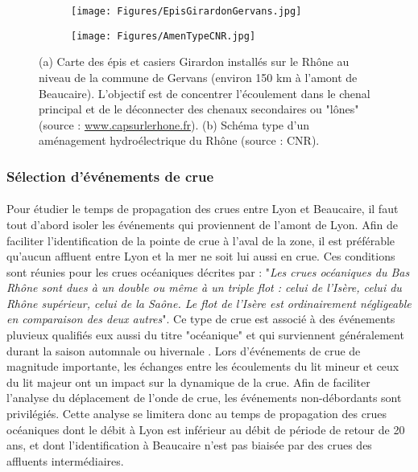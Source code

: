 \documentclass[11pt]{article}
\begin{document}
	\begin{figure}[h!]
		\centering
		\begin{subfigure}{0.7\linewidth}
		\texttt{[image: Figures/EpisGirardonGervans.jpg]}
		\caption{}
		\label{subfig:Girardon}
		\end{subfigure}	
		\begin{subfigure}{0.5\linewidth}
		\centering
		\texttt{[image: Figures/AmenTypeCNR.jpg]}
		\caption{}
		\label{subfig:SchemaCNR}
		\end{subfigure}
		\caption{(a) Carte des épis et casiers Girardon installés sur le Rhône au niveau de la commune de Gervans (environ 150 km à l'amont de Beaucaire). L'objectif est de concentrer l'écoulement dans le chenal principal et de le déconnecter des chenaux secondaires ou "lônes" (source : \url{www.capsurlerhone.fr}). (b) Schéma type d'un aménagement hydroélectrique du Rhône (source : CNR).}
	\end{figure}		

	\FloatBarrier
		
	\subsubsection{Sélection d'événements de crue}
	
	\paragraph{} Pour étudier le temps de propagation des crues entre Lyon et Beaucaire, il faut tout d'abord isoler les événements qui proviennent de l'amont de Lyon. Afin de faciliter l'identification de la pointe de crue à l'aval de la zone, il est préférable qu'aucun affluent entre Lyon et la mer ne soit lui aussi en crue. Ces conditions sont réunies pour les crues océaniques décrites par \citet{parde_regime_1919} : "\textit{Les crues océaniques du Bas Rhône sont dues à un double ou même à un triple flot : celui de l'Isère, celui du Rhône supérieur, celui de la Saône. Le flot de l'Isère est ordinairement négligeable en comparaison des deux autres}". Ce type de crue est associé à des événements pluvieux qualifiés eux aussi du titre "océanique" et qui surviennent généralement durant la saison automnale ou hivernale \citep{parde_regime_1925}. Lors d'événements de crue de magnitude importante, les échanges entre les écoulements du lit mineur et ceux du lit majeur ont un impact sur la dynamique de la crue. Afin de faciliter l'analyse du déplacement de l'onde de crue, les événements non-débordants sont privilégiés. Cette analyse se limitera donc au temps de propagation des crues océaniques dont le débit à Lyon est inférieur au débit de période de retour de 20 ans, et dont l'identification à Beaucaire n'est pas biaisée par des crues des affluents intermédiaires. 
	
\end{document}
